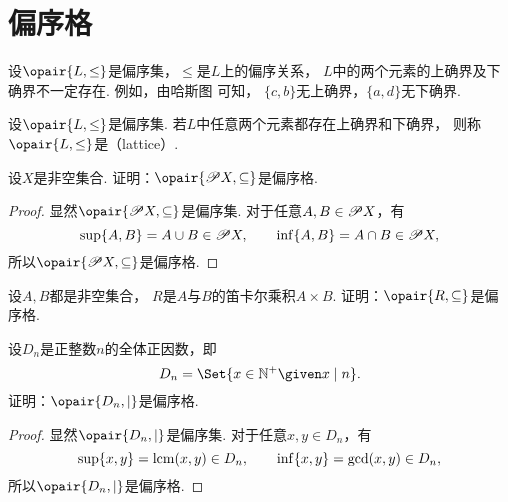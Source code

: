 \section{偏序格}
设\(\opair{L,\leq}\)是偏序集，\(\leq\)是\(L\)上的偏序关系，
\(L\)中的两个元素的上确界及下确界不一定存在.
例如，由哈斯图  可知，
\(\{c,b\}\)无上确界，\(\{a,d\}\)无下确界.

\begin{figure}[htb]
	\centering
	\caption{}
	\label{figure:格论.偏序集1}
\end{figure}

\begin{definition}
设\(\opair{L,\leq}\)是偏序集.
若\(L\)中任意两个元素都存在上确界和下确界，
则称\(\opair{L,\leq}\)是（lattice）.
\end{definition}

\begin{example}
设\(X\)是非空集合.
证明：\(\opair{\Powerset X,\subseteq}\)是偏序格.
\begin{proof}
显然\(\opair{\Powerset X,\subseteq}\)是偏序集.
对于任意\(A,B \in \mathscr{P} X\)，有\[
	\sup\{A,B\}
	= A \cup B
	\in \mathscr{P} X,
	\qquad
	\inf\{A,B\}
	= A \cap B
	\in \mathscr{P} X,
\]
所以\(\opair{\Powerset X,\subseteq}\)是偏序格.
\end{proof}
\end{example}

\begin{example}
设\(A,B\)都是非空集合，
\(R\)是\(A\)与\(B\)的笛卡尔乘积\(A \times B\).
证明：\(\opair{R,\subseteq}\)是偏序格.
\end{example}

\begin{example}
设\(D_n\)是正整数\(n\)的全体正因数，即\[
	D_n = \Set{ x\in\mathbb{N}^+ \given x \mid n }.
\]
证明：\(\opair{D_n,\mid}\)是偏序格.
\begin{proof}
显然\(\opair{D_n,\mid}\)是偏序集.
对于任意\(x,y \in D_n\)，有\[
	\sup\{x,y\}
	= \operatorname{lcm}(x,y)
	\in D_n,
	\qquad
	\inf\{x,y\}
	= \operatorname{gcd}(x,y)
	\in D_n,
\]
所以\(\opair{D_n,\mid}\)是偏序格.
\end{proof}
\end{example}
